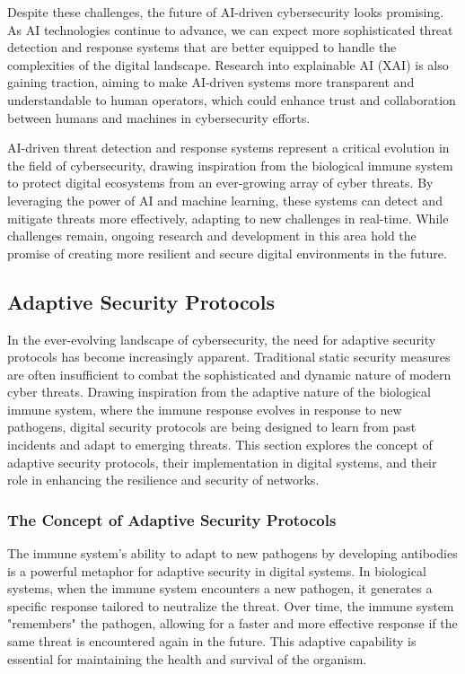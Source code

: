 \documentclass[12pt,twoside]{article}
\begin{document}
Despite these challenges, the future of AI-driven cybersecurity looks promising. As AI technologies continue to advance, we can expect more sophisticated threat detection and response systems that are better equipped to handle the complexities of the digital landscape. Research into explainable AI (XAI) is also gaining traction, aiming to make AI-driven systems more transparent and understandable to human operators, which could enhance trust and collaboration between humans and machines in cybersecurity efforts.

AI-driven threat detection and response systems represent a critical evolution in the field of cybersecurity, drawing inspiration from the biological immune system to protect digital ecosystems from an ever-growing array of cyber threats. By leveraging the power of AI and machine learning, these systems can detect and mitigate threats more effectively, adapting to new challenges in real-time. While challenges remain, ongoing research and development in this area hold the promise of creating more resilient and secure digital environments in the future.

\subsection{Adaptive Security Protocols}

In the ever-evolving landscape of cybersecurity, the need for adaptive security protocols has become increasingly apparent. Traditional static security measures are often insufficient to combat the sophisticated and dynamic nature of modern cyber threats. Drawing inspiration from the adaptive nature of the biological immune system, where the immune response evolves in response to new pathogens, digital security protocols are being designed to learn from past incidents and adapt to emerging threats. This section explores the concept of adaptive security protocols, their implementation in digital systems, and their role in enhancing the resilience and security of networks.

\subsubsection{The Concept of Adaptive Security Protocols}

The immune system's ability to adapt to new pathogens by developing antibodies is a powerful metaphor for adaptive security in digital systems. In biological systems, when the immune system encounters a new pathogen, it generates a specific response tailored to neutralize the threat. Over time, the immune system "remembers" the pathogen, allowing for a faster and more effective response if the same threat is encountered again in the future. This adaptive capability is essential for maintaining the health and survival of the organism.
\end{document}
